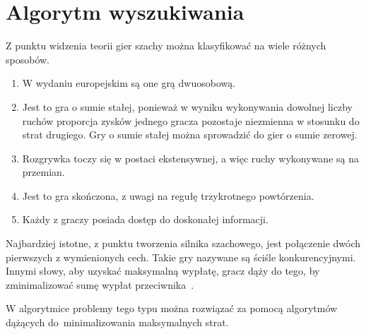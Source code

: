 \section{Algorytm wyszukiwania}
\label {sec:algorytm-wyszukiwania}


Z punktu widzenia teorii gier szachy można klasyfikować na wiele różnych sposobów.
\begin{enumerate}
    \item W wydaniu europejskim są one grą dwuosobową.
    \item Jest to gra o sumie stałej, ponieważ w wyniku wykonywania dowolnej liczby ruchów proporcja zysków jednego gracza pozostaje niezmienna w stosunku do strat drugiego.
    Gry o sumie stałej można sprowadzić do gier o sumie zerowej.
    \item Rozgrywka toczy się w postaci ekstensywnej, a więc ruchy wykonywane są na przemian.
    \item Jest to gra skończona, z uwagi na regułę trzykrotnego powtórzenia.
    \item Każdy z graczy posiada dostęp do doskonałej informacji.
\end{enumerate}

Najbardziej istotne, z punktu tworzenia silnika szachowego, jest połączenie dwóch pierwszych z wymienionych cech.
Takie gry nazywane są ściśle konkurencyjnymi.
Innymi słowy, aby uzyskać maksymalną wypłatę, gracz dąży do tego, by zminimalizować sumę wypłat przeciwnika~\cite*{wstep-teoria-gier}.

W algorytmice problemy tego typu można rozwiązać za pomocą algorytmów dążących do~minimalizowania maksymalnych strat.


